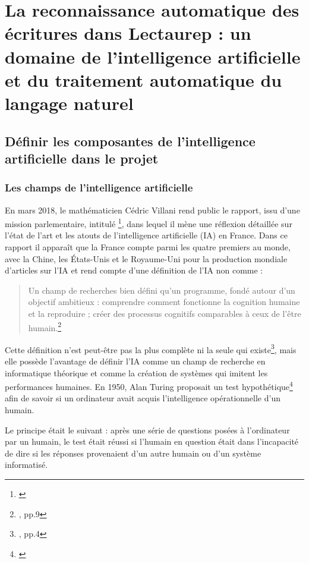 \chapter{La reconnaissance automatique des écritures dans Lectaurep : un domaine de l'intelligence artificielle et du traitement automatique du langage naturel}

\section{Définir les composantes de l'intelligence artificielle dans le projet}

\subsection{Les champs de l'intelligence artificielle}

En mars 2018, le mathématicien Cédric Villani rend public le rapport, issu d'une mission parlementaire, intitulé \footnote{\cite{villani_rapport_2018}}, dans lequel il mène une réflexion détaillée sur l'état de l'art et les atouts de l'intelligence artificielle (IA) en France. Dans ce rapport il apparaît que la France compte parmi les quatre premiers au monde, avec la Chine, les États-Unis et le Royaume-Uni pour la production mondiale d'articles sur l'IA et rend compte d'une définition de l'IA non comme :
\newpage
\begin{quote}
    Un champ de recherches bien défini qu'un programme, fondé autour d'un objectif ambitieux : comprendre comment fonctionne la cognition humaine et la reproduire ; créer des processus cognitifs comparables à ceux de l'être humain.\footnote{\cite{villani_rapport_2018}, pp.9}
\end{quote}
Cette définition n'est peut-être pas la plus complète ni la seule qui existe\footnote{\cite{russell_intelligence_2010}, pp.4}, mais elle possède l'avantage de définir l'IA comme un champ de recherche en informatique théorique et comme la création de systèmes qui imitent les performances humaines. En 1950, Alan Turing proposait un test hypothétique\footnote{\cite{turing_computing_1950}} afin de savoir si un ordinateur avait acquis l'intelligence opérationnelle d'un humain.

Le principe était le suivant : après une série de questions posées à l'ordinateur par un humain, le test était réussi si l'humain en question était dans l'incapacité de dire si les réponses provenaient d'un autre humain ou d'un système informatisé. 


